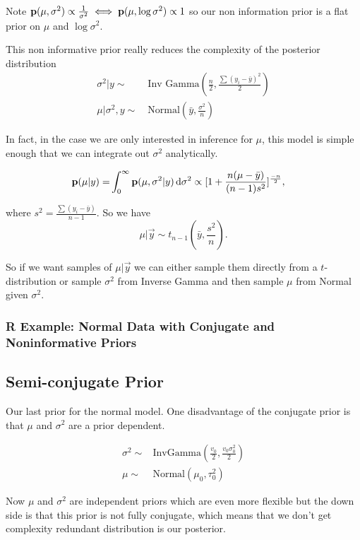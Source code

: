 Note ${\mathbf p}(\mu, \sigma^2) \propto \frac{1}{\sigma^2} \iff {\mathbf p}(\mu, \log \sigma^2) \propto 1$ so our non information prior is a flat prior on $\mu$ and $\log \sigma^2$.

This non informative prior really reduces the complexity of the posterior distribution
\begin{align*}
    \sigma^2| y 
    \sim&~ \text{Inv Gamma}(\frac{n}{2}, \frac{\sum(y_i - \bar{y})^2}{2})\\
    \mu| \sigma^2,y \sim&~ \text{Normal}(\bar{y}, \frac{\sigma^2}{n})
\end{align*}

In fact, in the case we are only interested in inference for $\mu$, this model is simple enough that we can integrate out $\sigma^2$ analytically.


\begin{align*}
    {\mathbf p}(\mu| y) 
    =& \int_0^\infty {\mathbf p}(\mu, \sigma^2| y) \mathop{}\!\mathrm{d} \sigma^2
    \propto
    [1 + \frac{n(\mu - \bar{y})}{(n-1)s^2}]^{\frac{-n}{2}},
\end{align*}

where $s^2 = \frac{\sum(y_i - \bar{y})}{n - 1}$. So we have 
\[
\mu| \vec{y} \sim t_{n-1}(\bar{y}, \frac{s^2}{n}).
\]

So if we want samples of $\mu|\vec{y}$ we can either sample them directly from a $t$-distribution or sample $\sigma^2$ from Inverse Gamma and then sample $\mu$ from Normal given $\sigma^2$.

\subsubsection{R Example: Normal Data with Conjugate and Noninformative Priors}

\subsection{Semi-conjugate Prior}
Our last prior for the normal model. One disadvantage of the conjugate prior is that $\mu$ and $\sigma^2$ are a prior dependent.

\begin{align*}
    \sigma^2 \sim& \text{InvGamma}(\frac{v_0}{2}, \frac{v_0 \sigma^2_0}{2})\\
    \mu \sim& \text{Normal}(\mu_0, \tau_0^2)
\end{align*}

Now $\mu$ and $\sigma^2$ are independent priors which are even more flexible but the down side is that this prior is not fully conjugate, which means that we don't get complexity redundant distribution is our posterior.

